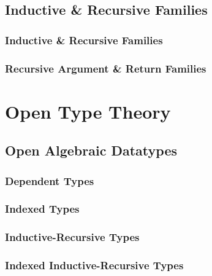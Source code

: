 \documentclass[12pt]{report}
\theoremstyle{definition}
\theoremstyle{remark}
\numberwithin{definition}{section}
\numberwithin{equation}{section}
\numberwithin{proposition}{section}
\numberwithin{conjecture}{section}
\numberwithin{theorem}{section}
\numberwithin{lemma}{section}
\numberwithin{corollary}{section}
\numberwithin{example}{section}
\numberwithin{remark}{section}
\begin{document}
\chapter{Inductive \& Recursive Families}\label{ch:indrec}
\section{Inductive \& Recursive Families}
\section{Recursive Argument \& Return Families}


\part{Open Type Theory}\label{part:open}


\chapter{Open Algebraic Datatypes}\label{ch:desc}
\section{Dependent Types}
\section{Indexed Types}
\section{Inductive-Recursive Types}
\section{Indexed Inductive-Recursive Types}
\end{document}
